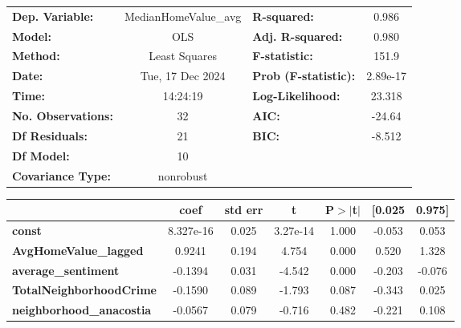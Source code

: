 \begin{center}
\begin{tabular}{lclc}
\toprule
\textbf{Dep. Variable:}                 & MedianHomeValue\_avg & \textbf{  R-squared:         } &     0.986   \\
\textbf{Model:}                         &         OLS          & \textbf{  Adj. R-squared:    } &     0.980   \\
\textbf{Method:}                        &    Least Squares     & \textbf{  F-statistic:       } &     151.9   \\
\textbf{Date:}                          &   Tue, 17 Dec 2024   & \textbf{  Prob (F-statistic):} &  2.89e-17   \\
\textbf{Time:}                          &       14:24:19       & \textbf{  Log-Likelihood:    } &    23.318   \\
\textbf{No. Observations:}              &            32        & \textbf{  AIC:               } &    -24.64   \\
\textbf{Df Residuals:}                  &            21        & \textbf{  BIC:               } &    -8.512   \\
\textbf{Df Model:}                      &            10        & \textbf{                     } &             \\
\textbf{Covariance Type:}               &      nonrobust       & \textbf{                     } &             \\
\bottomrule
\end{tabular}
\begin{tabular}{lcccccc}
                                        & \textbf{coef} & \textbf{std err} & \textbf{t} & \textbf{P$> |$t$|$} & \textbf{[0.025} & \textbf{0.975]}  \\
\midrule
\textbf{const}                          &    8.327e-16  &        0.025     &  3.27e-14  &         1.000        &       -0.053    &        0.053     \\
\textbf{AvgHomeValue\_lagged}           &       0.9241  &        0.194     &     4.754  &         0.000        &        0.520    &        1.328     \\
\textbf{average\_sentiment}             &      -0.1394  &        0.031     &    -4.542  &         0.000        &       -0.203    &       -0.076     \\
\textbf{TotalNeighborhoodCrime}         &      -0.1590  &        0.089     &    -1.793  &         0.087        &       -0.343    &        0.025     \\
\textbf{neighborhood\_anacostia}        &      -0.0567  &        0.079     &    -0.716  &         0.482        &       -0.221    &        0.108     \\

\end{tabular}
\end{center}
